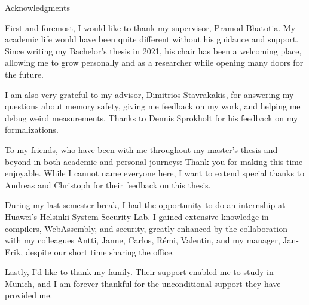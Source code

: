 \thispagestyle{empty}

\vspace*{20mm}

\begin{center}
{ Acknowledgments}
\end{center}

\vspace{10mm}

First and foremost, I would like to thank my supervisor, Pramod Bhatotia.
My academic life would have been quite different without his guidance and support.
Since writing my Bachelor's thesis in 2021, his chair has been a welcoming place, allowing me to grow personally and as a researcher while opening many doors for the future.

\noindent
I am also very grateful to my advisor, Dimitrios Stavrakakis, for answering my questions about memory safety, giving me feedback on my work, and helping me debug weird measurements.
Thanks to Dennis Sprokholt for his feedback on my formalizations.


To my friends, who have been with me throughout my master's thesis and beyond in both academic and personal journeys:
Thank you for making this time enjoyable.
While I cannot name everyone here, I want to extend special thanks to Andreas and Christoph for their feedback on this thesis.

During my last semester break, I had the opportunity to do an internship at Huawei's Helsinki System Security Lab.
I gained extensive knowledge in compilers, WebAssembly, and security, greatly enhanced by the collaboration with my colleagues Antti, Janne, Carlos, Rémi, Valentin, and my manager, Jan-Erik, despite our short time sharing the office.

Lastly, I'd like to thank my family.
Their support enabled me to study in Munich, and I am forever thankful for the unconditional support they have provided me.

\cleardoublepage{}
